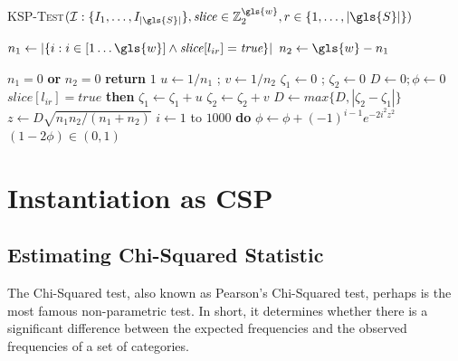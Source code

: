 \begin{algorithm}\footnotesize
    \caption{\textsc{\gls{KSP}-Test}{$( \mathcal{I}: \{I_1, \dots, I_{|\gls{S}|} \}, \mathit{slice} \in \mathbb{Z}_2^{\gls{w}}, r \in \{1,\dots,|\gls{S}|\} )$}}\label{KSPtest}
    \begin{algorithmic}[1]
        \State $n_1 \gets \left|\{ i: i \in [1\dots \gls{w}] \wedge \mathit{slice}[l_{ir}] = \textit{true} \}\right|$ %
        \State $n_2 \gets \gls{w} - n_1$ 

         $n_1 = 0$  {\bfseries or} $n_2 = 0$ {\bfseries return} $1$
        \State $u \gets 1/n_1$ ; $v \gets 1/n_2$
        \State $\zeta_1 \gets 0$ ; $\zeta_2 \gets 0$
        \State $D \gets 0 ; \phi \gets 0$ 
         \label{start-computing-D}
             $\mathit{slice}[l_{ir}] = true$ {\bfseries then} $\zeta_1 \gets \zeta_1 + u $
             $\zeta_2 \gets \zeta_2 + v $
            \State $D \gets max \{D, |\zeta_2 - \zeta_1| \}$
        \EndFor \label{end-computing-D}
        \State $z \gets D \sqrt{n_1 n_2 / (n_1 + n_2)}$
         $i \gets 1$ to $1000$ {\bfseries do} $\phi \gets \phi + (-1)^{i-1}e^{-2i^2z^2}$ \label{ks-approx}
        \Return $(1 - 2 \phi) \in (0,1)$
    \end{algorithmic}
\end{algorithm}

\section{Instantiation as \acrfull{CSP}}

\subsection{Estimating Chi-Squared Statistic}

The Chi-Squared test, also known as Pearson's Chi-Squared test, perhaps is the most famous non-parametric test. In short, it determines whether there is a significant difference between the expected frequencies and the observed frequencies of a set of categories. 

